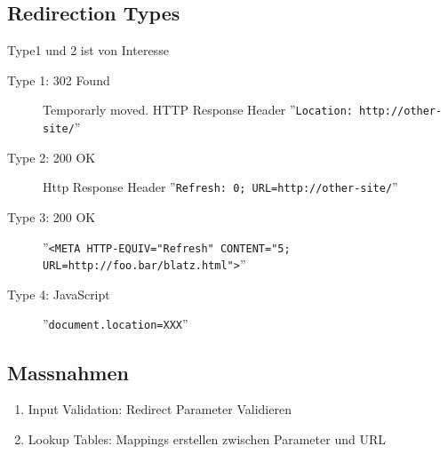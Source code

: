 \subsection{Redirection Types}
Type1 und 2 ist von Interesse
\begin{description}
	\item[Type 1: 302 Found] Temporarly moved. HTTP Response Header ''\lstinline|Location: http://other-site/|''
	\item[Type 2: 200 OK] Http Response Header ''\lstinline|Refresh: 0; URL=http://other-site/|''
	\item[Type 3: 200 OK] ''\lstinline|<META HTTP-EQUIV="Refresh" CONTENT="5; URL=http://foo.bar/blatz.html">|''
	\item[Type 4: JavaScript] ''\lstinline|document.location=XXX|''
\end{description}


\subsection{Massnahmen}
\begin{enumerate}
	\item Input Validation: Redirect Parameter Validieren
	\item Lookup Tables: Mappings erstellen zwischen Parameter und URL
\end{enumerate}


